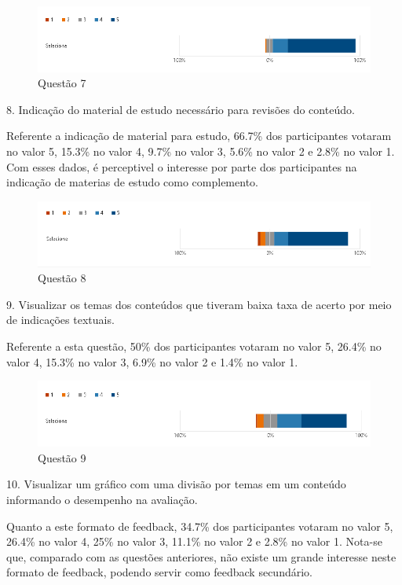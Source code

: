 \begin{figure}[H]
\centering
\includegraphics[scale=0.6]{figuras/7.png}
\caption{Questão 7}
\end{figure}


8. Indicação do material de estudo necessário para revisões do conteúdo.

Referente a indicação de material para estudo, 66.7\% dos participantes votaram no valor 5, 15.3\% no valor 4, 9.7\% no valor 3, 5.6\% no valor 2 e 2.8\% no valor 1. Com esses dados, é perceptivel o interesse por parte dos participantes na indicação de materias de estudo como complemento.

\begin{figure}[H]
\centering
\includegraphics[scale=0.6]{figuras/8.png}
\caption{Questão 8}
\end{figure}

9. Visualizar os temas dos conteúdos que tiveram baixa taxa de acerto por meio de indicações textuais.

Referente a esta questão, 50\% dos participantes votaram no valor 5, 26.4\% no valor 4, 15.3\% no valor 3, 6.9\% no valor 2 e 1.4\% no valor 1.

\begin{figure}[H]
\centering
\includegraphics[scale=0.6]{figuras/9.png}
\caption{Questão 9}
\end{figure}

10. Visualizar um gráfico com uma divisão por temas em um conteúdo informando o desempenho na avaliação.

Quanto a este formato de feedback, 34.7\% dos participantes votaram no valor 5, 26.4\% no valor 4, 25\% no valor 3, 11.1\% no valor 2 e 2.8\% no valor 1. Nota-se que, comparado com as questões anteriores, não existe um grande interesse neste formato de feedback, podendo servir como feedback secundário.

